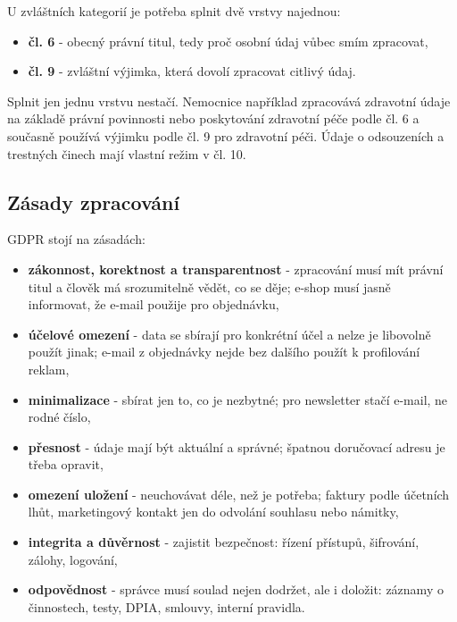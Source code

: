 U zvláštních kategorií je potřeba splnit dvě vrstvy najednou:
\begin{itemize}
  \item \textbf{čl. 6} - obecný právní titul, tedy proč osobní údaj vůbec smím zpracovat,
  \item \textbf{čl. 9} - zvláštní výjimka, která dovolí zpracovat citlivý údaj.
\end{itemize}
Splnit jen jednu vrstvu nestačí. Nemocnice například zpracovává zdravotní údaje na základě právní povinnosti nebo poskytování zdravotní péče podle čl. 6 a současně používá výjimku podle čl. 9 pro zdravotní péči. Údaje o odsouzeních a trestných činech mají vlastní režim v čl. 10.



\subsection*{Zásady zpracování}
GDPR stojí na zásadách:
\begin{itemize}
  \item \textbf{zákonnost, korektnost a transparentnost} - zpracování musí mít právní titul a člověk má srozumitelně vědět, co se děje; e-shop musí jasně informovat, že e-mail použije pro objednávku,
  \item \textbf{účelové omezení} - data se sbírají pro konkrétní účel a nelze je libovolně použít jinak; e-mail z objednávky nejde bez dalšího použít k profilování reklam,
  \item \textbf{minimalizace} - sbírat jen to, co je nezbytné; pro newsletter stačí e-mail, ne rodné číslo,
  \item \textbf{přesnost} - údaje mají být aktuální a správné; špatnou doručovací adresu je třeba opravit,
  \item \textbf{omezení uložení} - neuchovávat déle, než je potřeba; faktury podle účetních lhůt, marketingový kontakt jen do odvolání souhlasu nebo námitky,
  \item \textbf{integrita a důvěrnost} - zajistit bezpečnost: řízení přístupů, šifrování, zálohy, logování,
  \item \textbf{odpovědnost} - správce musí soulad nejen dodržet, ale i doložit: záznamy o činnostech, testy, DPIA, smlouvy, interní pravidla.
\end{itemize}

